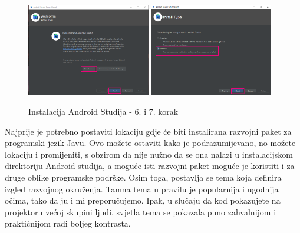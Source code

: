 \documentclass[11pt,a4paper,twoside]{article}
\begin{document}
	\begin{figure}[!h]
		\centering
		\includegraphics[width=0.48\textwidth]{install_06.png}
		\hfill
		\includegraphics[width=0.48\textwidth]{install_07.png}
		\caption{Instalacija Android Studija - 6. i 7. korak}
		\label{fig:install_06}	
	\end{figure}

	Najprije je potrebno postaviti lokaciju gdje će biti instalirana razvojni paket za programski jezik Javu. Ovo možete ostaviti kako je podrazumijevano, no možete lokaciju i promijeniti, s obzirom da nije nužno da se ona nalazi u instalacijskom direktoriju Android studija, a moguće isti razvojni paket moguće je koristiti i za druge oblike programske podrške. Osim toga, postavlja se tema koja definira izgled razvojnog okruženja. Tamna tema u pravilu je popularnija i ugodnija očima, tako da ju i mi preporučujemo. Ipak, u slučaju da kod pokazujete na projektoru većoj skupini ljudi, svjetla tema se pokazala puno zahvalnijom i praktičnijom radi boljeg kontrasta.
	
\end{document}

